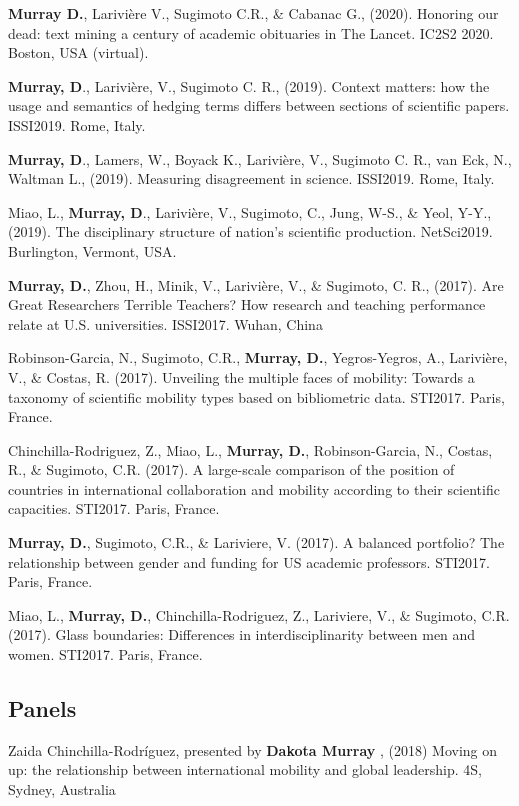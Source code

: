 \documentclass[10pt, a4paper]{article}
\newcommand{\years}[1]{\marginnote{\scriptsize #1}}
\begin{document}
\years{2020}  \hangindent=0.7cm \textbf{Murray D.}, Larivière V., Sugimoto C.R., \& Cabanac G., (2020). Honoring our dead: text mining a century of academic obituaries in The Lancet. IC2S2 2020. Boston, USA (virtual).

\years{2019} \hangindent=0.7cm \textbf{Murray, D}., Larivière, V., Sugimoto C. R., (2019). Context matters: how the usage and semantics of hedging terms differs between sections of scientific papers. ISSI2019. Rome, Italy.

\years{2019} \hangindent=0.7cm  \textbf{Murray, D}., Lamers, W., Boyack K., Larivière, V., Sugimoto C. R., van Eck, N., Waltman L., (2019). Measuring disagreement in science. ISSI2019. Rome, Italy.

\years{2019} \hangindent=0.7cm Miao, L., \textbf{Murray, D}., Larivière, V., Sugimoto, C., Jung, W-S., \&  Yeol, Y-Y., (2019). The disciplinary structure of nation's scientific production. NetSci2019. Burlington, Vermont, USA.

\years{2017} \hangindent=0.7cm \textbf{Murray, D.}, Zhou, H., Minik, V., Larivière, V., \& Sugimoto, C. R., (2017). Are Great Researchers Terrible Teachers? How research and teaching performance relate at U.S. universities. ISSI2017. Wuhan, China

\years{2017} \hangindent=0.7cm Robinson-Garcia, N., Sugimoto, C.R., \textbf{Murray, D.}, Yegros-Yegros, A., Larivière, V., \& Costas, R. (2017). Unveiling the multiple faces of mobility: Towards a taxonomy of scientific mobility types based on bibliometric data. STI2017. Paris, France.

\years{2017} \hangindent=0.7cm Chinchilla-Rodriguez, Z., Miao, L., \textbf{Murray, D.}, Robinson-Garcia, N., Costas, R., \& Sugimoto, C.R. (2017). A large-scale comparison of the position of countries in international collaboration and mobility according to their scientific capacities. STI2017. Paris, France.

\years{2017} \hangindent=0.7cm \textbf{Murray, D.}, Sugimoto, C.R., \& Lariviere, V. (2017). A balanced portfolio? The relationship between gender and funding for US academic professors. STI2017. Paris, France.

\years{2017} \hangindent=0.7cm Miao, L., \textbf{Murray, D.}, Chinchilla-Rodriguez, Z., Lariviere, V., \& Sugimoto, C.R. (2017). Glass boundaries: Differences in interdisciplinarity between men and women. STI2017. Paris, France.

\subsection*{Panels}
\years{2018} \hangindent=0.7cm Zaida Chinchilla-Rodríguez, presented by \textbf{Dakota Murray }, (2018) Moving on up: the relationship between international mobility and global leadership. 4S, Sydney, Australia
\end{document}
